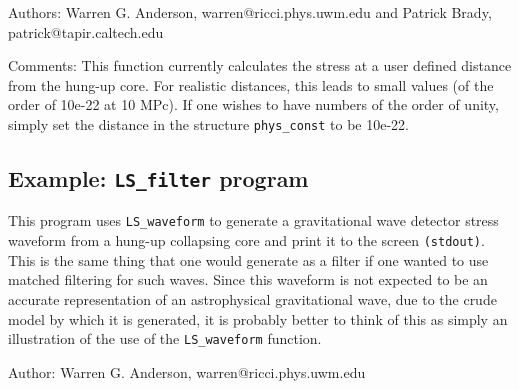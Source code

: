 \begin{description}
\item{Authors:} Warren G. Anderson, warren@ricci.phys.uwm.edu and
Patrick Brady,
patrick@tapir.caltech.edu
\item{Comments:} This function currently calculates the stress at a user
defined distance from the hung-up core. For realistic distances, this leads
to small values (of the order of 10e-22 at 10 MPc). If one wishes to have
numbers of the order of unity, simply set the distance in the structure
{\tt phys\_const} to be 10e-22.
\end{description}
\newpage

\subsection{Example: {\tt LS\_filter} program}
This program uses {\tt LS\_waveform} to generate a gravitational wave 
detector stress waveform from a hung-up collapsing core and print 
it to the screen {\tt (stdout)}. This is the same thing that one would
generate as a filter if one wanted to use matched filtering for such waves.
Since this waveform is not expected to be an accurate representation of an
astrophysical gravitational wave, due to the crude model by which it is
generated, it is probably better to think of this as simply an illustration of
the use of the {\tt LS\_waveform} function.


\begin{description}
\item{Author:} Warren G. Anderson, warren@ricci.phys.uwm.edu
\end{description}


